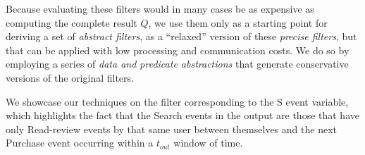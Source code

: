 Because evaluating these filters would in many cases be as expensive as 
computing
the complete result $Q$, we use them only as a starting point for deriving a set
of {\em abstract filters}, as a ``relaxed'' version of these
{\em precise filters}, but that can be applied with low processing and 
communication costs.
We do so by employing a series of {\em data and predicate abstractions} 
that generate conservative versions of the original filters.

\newcommand{\NotExistsP}{\ident{NotExistsP}}
\newcommand{\PrecedesP}{\precs{S}}
\newcommand{\PrecedesPP}{\omega_S}
\newcommand{\PrecedesPPP}{\psi_S}
\newcommand{\PrecedesPPPP}{\upsilon_S}


\newcommand{\interval}[1]{\lfloor #1 \rceil}
\newcommand{\uinterval}[1]{\lceil #1 \rfloor}
\newcommand{\hashid}[1]{\# #1}

 We showcase our techniques on the filter corresponding to the S event 
variable,
 which highlights the fact that the Search events in the output are 
those  
 that have only Read-review events by that same user between themselves and the 
 next Purchase 
 event occurring within a $t_{out}$ window of time.


